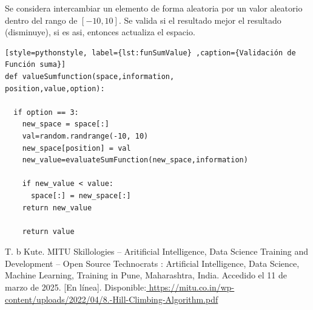 \documentclass[12pt,twoside]{article}
\begin{document}
Se considera intercambiar un elemento de forma aleatoria por un valor aleatorio dentro del rango de $[-10, 10]$. Se valida si el resultado mejor el resultado (disminuye), si es asi, entonces actualiza el espacio.

\begin{lstlisting}[style=pythonstyle, label={lst:funSumValue} ,caption={Validación de Función suma}]
def valueSumfunction(space,information,
position,value,option):

  if option == 3:
    new_space = space[:]
    val=random.randrange(-10, 10)
    new_space[position] = val
    new_value=evaluateSumFunction(new_space,information)

    if new_value < value:    
      space[:] = new_space[:]
    return new_value

	return value

\end{lstlisting}

	\clearpage
{}
\begin{thebibliography}{99}
	T. b Kute. MITU Skillologies – Aritificial Intelligence, Data Science Training and Development – Open Source Technocrats : Artificial Intelligence, Data Science, Machine Learning, Training in Pune, Maharashtra, India. Accedido el 11 de marzo de 2025. [En línea]. Disponible:\url{ https://mitu.co.in/wp-content/uploads/2022/04/8.-Hill-Climbing-Algorithm.pdf}
\end{thebibliography}
\end{document}
